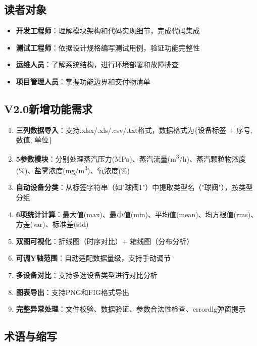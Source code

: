 \documentclass[12pt,a3paper]{ctexart}
\begin{document}
\subsection{读者对象}

\begin{itemize}
    \item \textbf{开发工程师}：理解模块架构和代码实现细节，完成代码集成
    \item \textbf{测试工程师}：依据设计规格编写测试用例，验证功能完整性
    \item \textbf{运维人员}：了解系统结构，进行环境部署和故障排查
    \item \textbf{项目管理人员}：掌握功能边界和交付物清单
\end{itemize}

\subsection{V2.0新增功能需求}

\begin{enumerate}[label=\textbf{FR-\arabic*:}]
    \item \textbf{三列数据导入}：支持.xlsx/.xls/.csv/.txt格式，数据格式为\{设备标签 + 序号, 数值, 单位\}
    \item \textbf{5参数模块}：分别处理蒸汽压力(MPa)、蒸汽流量(m\textsuperscript{3}/h)、蒸汽颗粒物浓度(\%)、盐雾浓度(mg/m\textsuperscript{3})、氧浓度(\%)
    \item \textbf{自动设备分类}：从标签字符串（如"球阀1"）中提取类型名（"球阀"），按类型分组
    \item \textbf{6项统计计算}：最大值(max)、最小值(min)、平均值(mean)、均方根值(rms)、方差(var)、标准差(std)
    \item \textbf{双图可视化}：折线图（时序对比）+ 箱线图（分布分析）
    \item \textbf{可调Y轴范围}：自动适配数据量级，支持手动调节
    \item \textbf{多设备对比}：支持多选设备类型进行对比分析
    \item \textbf{图表导出}：支持PNG和FIG格式导出
    \item \textbf{完整异常处理}：文件校验、数据验证、参数合法性检查、errordlg弹窗提示
\end{enumerate}

\subsection{术语与缩写}
\end{document}
